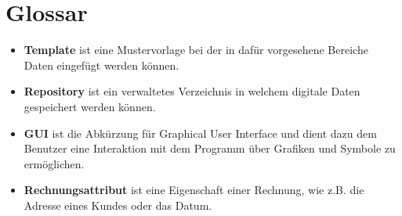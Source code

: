 
\section{Glossar}


\begin{itemize}
	\item \textbf{Template} ist eine Mustervorlage bei der in dafür vorgesehene Bereiche Daten eingefügt werden können.
	\item \textbf{Repository} ist ein verwaltetes Verzeichnis in welchem digitale Daten gespeichert werden können.
	\item \textbf{GUI} ist die Abkürzung für Graphical User Interface und dient dazu dem Benutzer eine Interaktion mit dem Programm über Grafiken und Symbole zu ermöglichen.
	\item \textbf{Rechnungsattribut} ist eine Eigenschaft einer Rechnung, wie z.B. die Adresse eines Kundes oder das Datum.
\end{itemize}

